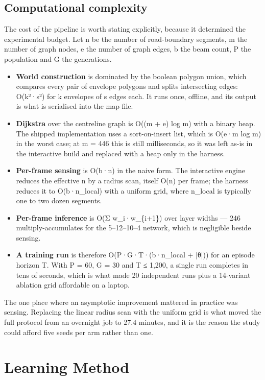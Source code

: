 \documentclass[conference]{IEEEtran}
\begin{document}
\subsection{Computational complexity}

The cost of the pipeline is worth stating explicitly, because it determined the experimental budget. Let n be the number of road-boundary segments, m the number of graph nodes, e the number of graph edges, b the beam count, P the population and G the generations.

\begin{itemize}
\item \textbf{World construction} is dominated by the boolean polygon union, which compares every pair of envelope polygons and splits intersecting edges: O(k²·s²) for k envelopes of s edges each. It runs once, offline, and its output is what is serialised into the map file.
\item \textbf{Dijkstra} over the centreline graph is O((m + e) log m) with a binary heap. The shipped implementation uses a sort-on-insert list, which is O(e·m log m) in the worst case; at m = 446 this is still milliseconds, so it was left as-is in the interactive build and replaced with a heap only in the harness.
\item \textbf{Per-frame sensing} is O(b·n) in the naive form. The interactive engine reduces the effective n by a radius scan, itself O(n) per frame; the harness reduces it to O(b·n\_local) with a uniform grid, where n\_local is typically one to two dozen segments.
\item \textbf{Per-frame inference} is O(Σ w\_i·w\_\{i+1\}) over layer widths — 246 multiply-accumulates for the 5–12–10–4 network, which is negligible beside sensing.
\item \textbf{A training run} is therefore O(P·G·T·(b·n\_local + |θ|)) for an episode horizon T. With P = 60, G = 30 and T ≤ 1,200, a single run completes in tens of seconds, which is what made 20 independent runs plus a 14-variant ablation grid affordable on a laptop.
\end{itemize}

The one place where an asymptotic improvement mattered in practice was sensing. Replacing the linear radius scan with the uniform grid is what moved the full protocol from an overnight job to 27.4 minutes, and it is the reason the study could afford five seeds per arm rather than one.

\section{Learning Method}
\end{document}
